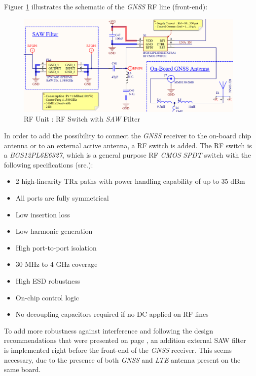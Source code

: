 \documentclass[report.tex]{subfiles}
\begin{document}
Figuer \ref{fig:LTEWatch_LTEW_RF_Unit_RF_Switch} illustrates the schematic of the \textit{GNSS} RF line (front-end):

\begin{figure}[H]
	\centering
	\includegraphics[width=1\textwidth]{Include/Figure/Hardware/LTEWatch_LTEW_RF_Unit_RF_Switch}
	\caption{RF Unit : RF Switch with \textit{SAW} Filter}
	\label{fig:LTEWatch_LTEW_RF_Unit_RF_Switch}
\end{figure}

In order to add the possibility to connect the \textit{GNSS} receiver to the on-board chip antenna or to an external active antenna, a RF switch is added. The RF switch is a \textit{BGS12PL6E6327}\cite{BGS12PL6}, which is a general purpose RF \textit{CMOS} \textit{SPDT} switch with the following specifications (src.\cite{BGS12PL6}):
\begin{itemize}
\item 2 high-linearity TRx paths with power handling capability of up to 35 dBm
\item All ports are fully symmetrical
\item Low insertion loss
\item Low harmonic generation
\item High port-to-port isolation
\item 30 MHz to 4 GHz coverage
\item High ESD robustness
\item On-chip control logic
\item No decoupling capacitors required if no DC applied on RF lines\\
\end{itemize}

To add more robustness against interference and following the design recommendations that were presented on page \pageref{sec:gnss_rcvr_sel}, an addition external SAW filter is implemented right before the front-end of the \textit{GNSS} receiver. This seems necessary, due to the presence of both \textit{GNSS} and \textit{LTE} antenna present on the same board.\\
\end{document}
